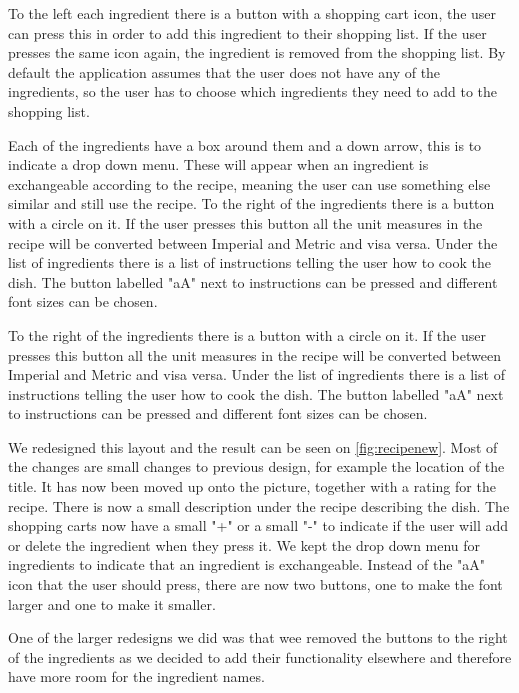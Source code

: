 To the left each ingredient there is a button with a shopping cart icon, the user can press this in order to add this ingredient to their shopping list. If the user presses the same icon again, the ingredient is removed from the shopping list. By default the application assumes that the user does not have any of the ingredients, so the user has to choose which ingredients they need to add to the shopping list.

Each of the ingredients have a box around them and a down arrow, this is to indicate a drop down menu. These will appear when an ingredient is exchangeable according to the recipe, meaning the user can use something else similar and still use the recipe. To the right of the ingredients there is a button with a circle on it. If the user presses this button all the unit measures in the recipe will be converted between Imperial and Metric and visa versa. Under the list of ingredients there is a list of instructions telling the user how to cook the dish. The button labelled "aA" next to instructions can be pressed and different font sizes can be chosen.
 

To the right of the ingredients there is a button with a circle on it. If the user presses this button all the unit measures in the recipe will be converted between Imperial and Metric and visa versa. Under the list of ingredients there is a list of instructions telling the user how to cook the dish. The button labelled "aA" next to instructions can be pressed and different font sizes can be chosen. 

We redesigned this layout and the result can be seen on \autoref{fig:recipenew}. Most of the changes are small changes to previous design, for example the location of the title. It has now been moved up onto the picture, together with a rating for the recipe. There is now a small description under the recipe describing the dish. The shopping carts now have a small "+" or a small "-" to indicate if the user will add or delete the ingredient when they press it. We kept the drop down menu for ingredients to indicate that an ingredient is exchangeable. Instead of the "aA" icon that the user should press, there are now two buttons, one to make the font larger and one to make it smaller.

One of the larger redesigns we did was that wee removed the buttons to the right of the ingredients as we decided to add their functionality elsewhere and therefore have more room for the ingredient names. 
 
